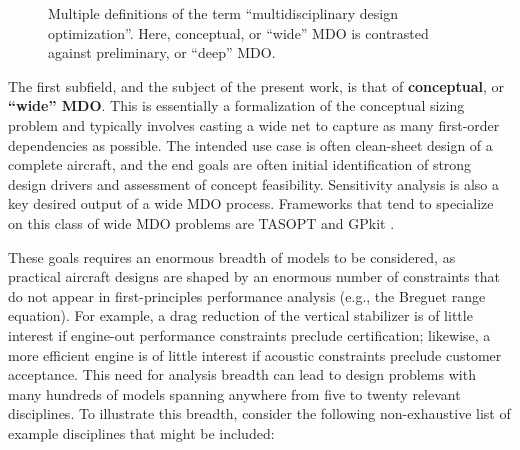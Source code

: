 \begin{figure}[h]
    \centering
    \caption{Multiple definitions of the term ``multidisciplinary design optimization''. Here, conceptual, or ``wide'' MDO is contrasted against preliminary, or ``deep'' MDO.}
    \label{fig:mdo_overloaded_term}
\end{figure}

The first subfield, and the subject of the present work, is that of \textbf{conceptual}, or \textbf{``wide'' MDO}. This is essentially a formalization of the conceptual sizing problem and typically involves casting a wide net to capture as many first-order dependencies as possible. The intended use case is often clean-sheet design of a complete aircraft, and the end goals are often initial identification of strong design drivers and assessment of concept feasibility. Sensitivity analysis is also a key desired output of a wide MDO process. Frameworks that tend to specialize on this class of wide MDO problems are TASOPT \cite{drela_tasopt_2010} and GPkit \cite{gpkit}.

These goals requires an enormous breadth of models to be considered, as practical aircraft designs are shaped by an enormous number of constraints that do not appear in first-principles performance analysis (e.g., the Breguet range equation). For example, a drag reduction of the vertical stabilizer is of little interest if engine-out performance constraints preclude certification; likewise, a more efficient engine is of little interest if acoustic constraints preclude customer acceptance. This need for analysis breadth can lead to design problems with many hundreds of models spanning anywhere from five to twenty relevant disciplines. To illustrate this breadth, consider the following non-exhaustive list of example disciplines that might be included:

